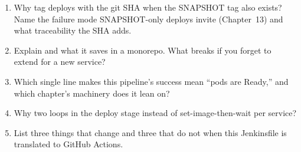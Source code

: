 \begin{quiz}
\begin{enumerate}
  \item Why tag deploys with the git SHA when the SNAPSHOT tag also
  exists? Name the failure mode SNAPSHOT-only deploys invite
  (Chapter~13) and what traceability the SHA adds.
  \item Explain  and what it saves in a monorepo.
  What breaks if you forget to extend  for a new service?
  \item Which single line makes this pipeline's success mean ``pods
  are Ready,'' and which chapter's machinery does it lean on?
  \item Why two loops in the deploy stage instead of
  set-image-then-wait per service?
  \item List three things that change and three that do not when this
  Jenkinsfile is translated to GitHub Actions.
\end{enumerate}
\end{quiz}

